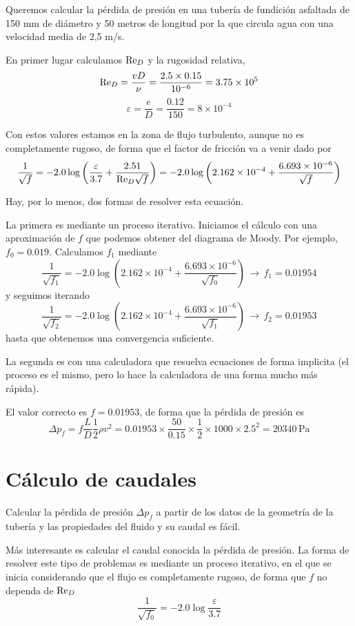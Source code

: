 Queremos calcular la pérdida de presión en una tubería de fundición asfaltada de 150 mm de diámetro y 50 metros de longitud por la que circula agua con una velocidad media de 2,5 m/s.

En primer lugar calculamos $\text{Re}_D$ y la rugosidad relativa,
\[\text{Re}_D = \frac{v D}{\nu} = \frac{2.5\times 0.15}{10^{-6}} = 3.75\times10^5\]
\[\varepsilon = \frac{e}{D} = \frac{0.12}{150} = 8\times10^{-4}\]

Con estos valores estamos en la zona de flujo turbulento, aunque no es completamente rugoso, de forma que el factor de fricción va a venir dado por
\[
\frac{1}{\sqrt{f}} = -2.0 \log \left( \frac{\varepsilon}{3.7} + \frac{2.51}{\text{Re}_D \sqrt{f}} \right) = -2.0 \log \left( 2.162\times10^{-4} + \frac{6.693\times10^{-6}}{\sqrt{f}}\right)
\]

Hay, por lo menos, dos formas de resolver esta ecuación.

La primera es mediante un proceso iterativo. Iniciamos el cálculo con una aproximación de $f$ que podemos obtener del diagrama de Moody. Por ejemplo, $f_0=0.019$. Calculamos $f_1$ mediante
\[\frac{1}{\sqrt{f_1}} = -2.0 \log \left( 2.162\times10^{-4} + \frac{6.693\times10^{-6}}{\sqrt{f_0}}\right)\,\rightarrow\, f_1 = 0.01954
\]
y seguimos iterando
\[\frac{1}{\sqrt{f_2}} = -2.0 \log \left( 2.162\times10^{-4} + \frac{6.693\times10^{-6}}{\sqrt{f_1}}\right)\,\rightarrow\, f_2 = 0.01953
\]
hasta que obtenemos una convergencia suficiente.

La segunda es con una calculadora que resuelva ecuaciones de forma implicita (el proceso es el mismo, pero lo hace la calculadora de una forma mucho más rápida).

El valor correcto es $f= 0.01953$, de forma que la pérdida de presión es
\[\Delta p_f = f \frac{L}{D} \frac{1}{2}\rho v^2 = 0.01953 \times \frac{50}{0.15}\times\frac{1}{2}\times1000\times2.5^2 = 20340 \, \text{Pa}\]

\section{Cálculo de caudales}
Calcular la pérdida de presión $\Delta p_f$ a partir de los datos de la geometría de la tubería y las propiedades del fluido y su caudal es fácil.

Más interesante es calcular el caudal conocida la pérdida de presión. La forma de resolver este tipo de problemas es mediante un proceso iterativo, en el que se inicia considerando que el flujo es completamente rugoso, de forma que $f$ no dependa de $\text{Re}_D$
\[
\frac{1}{\sqrt{f_0}} = -2.0 \log \frac{\varepsilon}{3.7}
\]

